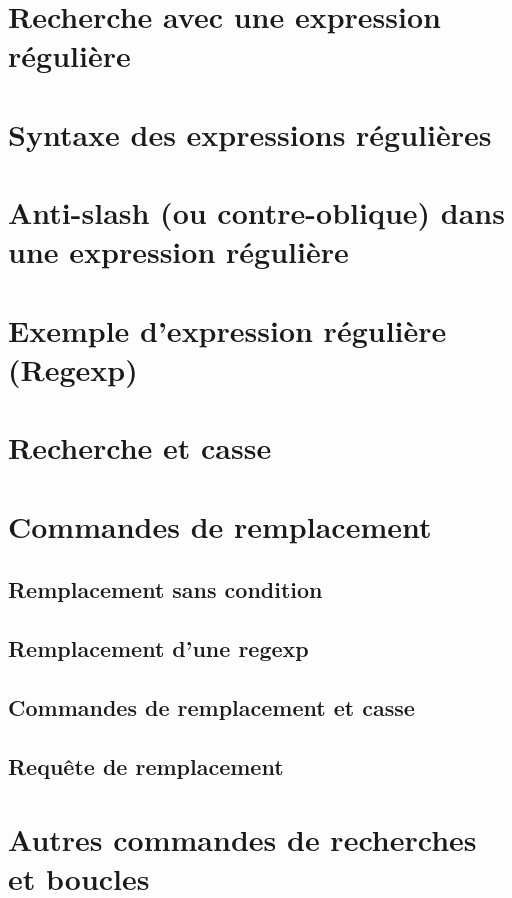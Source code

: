 \section{Recherche avec une expression régulière}
\section{Syntaxe des expressions régulières}
\section{Anti-slash (ou contre-oblique) dans une expression
  régulière}
\section{Exemple d'expression régulière (Regexp)}
\section{Recherche et casse}
\section{Commandes de remplacement}
\subsection{Remplacement sans condition}
\subsection{Remplacement d'une regexp}
\subsection{Commandes de remplacement et casse}
\subsection{Requête de remplacement}
\section{Autres commandes de recherches et boucles}

